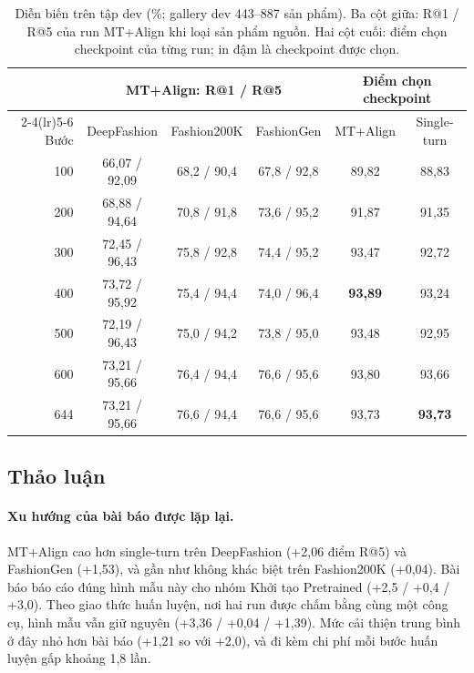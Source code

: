 \begin{table}[h]
\centering
\caption{Diễn biến trên tập dev (\%; gallery dev 443--887 sản phẩm). Ba cột giữa: R@1 / R@5 của run MT+Align khi loại sản phẩm nguồn. Hai cột cuối: điểm chọn checkpoint của từng run; in đậm là checkpoint được chọn.}
\label{tab:train-dev}
\small
\begin{tabular}{rccccc}
\toprule
& \multicolumn{3}{c}{MT+Align: R@1 / R@5} & \multicolumn{2}{c}{Điểm chọn checkpoint} \\
\cmidrule(lr){2-4}\cmidrule(lr){5-6}
Bước & DeepFashion & Fashion200K & FashionGen & MT+Align & Single-turn \\
\midrule
100 & 66,07 / 92,09 & 68,2 / 90,4 & 67,8 / 92,8 & 89,82 & 88,83 \\
200 & 68,88 / 94,64 & 70,8 / 91,8 & 73,6 / 95,2 & 91,87 & 91,35 \\
300 & 72,45 / 96,43 & 75,8 / 92,8 & 74,4 / 95,2 & 93,47 & 92,72 \\
400 & 73,72 / 95,92 & 75,4 / 94,4 & 74,0 / 96,4 & \textbf{93,89} & 93,24 \\
500 & 72,19 / 96,43 & 75,0 / 94,2 & 73,8 / 95,0 & 93,48 & 92,95 \\
600 & 73,21 / 95,66 & 76,4 / 94,4 & 76,6 / 95,6 & 93,80 & 93,66 \\
644 & 73,21 / 95,66 & 76,6 / 94,4 & 76,6 / 95,6 & 93,73 & \textbf{93,73} \\
\bottomrule
\end{tabular}
\end{table}

\subsection{Thảo luận}

\paragraph{Xu hướng của bài báo được lặp lại.} MT+Align cao hơn single-turn trên DeepFashion (+2,06 điểm R@5) và FashionGen (+1,53), và gần như không khác biệt trên Fashion200K (+0,04). Bài báo báo cáo đúng hình mẫu này cho nhóm Khởi tạo Pretrained (+2,5 / +0,4 / +3,0). Theo giao thức huấn luyện, nơi hai run được chấm bằng cùng một công cụ, hình mẫu vẫn giữ nguyên (+3,36 / +0,04 / +1,39). Mức cải thiện trung bình ở đây nhỏ hơn bài báo (+1,21 so với +2,0), và đi kèm chi phí mỗi bước huấn luyện gấp khoảng 1,8 lần.

